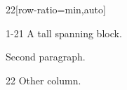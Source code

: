\documentclass[paper=A4]{ropas-poster}
\begin{document}
\begin{postergrid}{2}{2}[row-ratio={min,auto}]
\begin{posterblock}{1-2}{1}
A tall spanning block.

Second paragraph.
\end{posterblock}
\begin{posterblock}{2}{2}
Other column.
\end{posterblock}
\end{postergrid}
\end{document}
